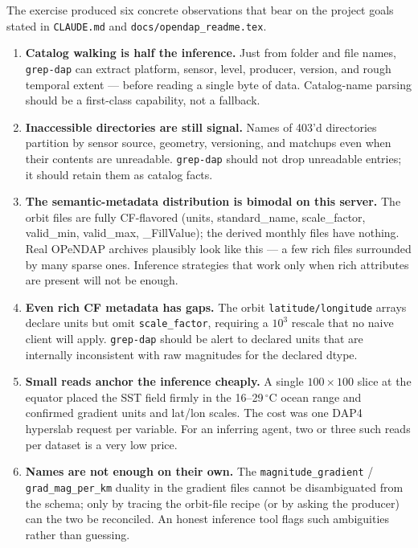 \documentclass[11pt]{article}
\begin{document}
The exercise produced six concrete observations that bear on the
project goals stated in \texttt{CLAUDE.md} and
\texttt{docs/opendap\_readme.tex}.

\begin{enumerate}
  \item \textbf{Catalog walking is half the inference.} Just from
    folder and file names, \texttt{grep-dap} can extract platform,
    sensor, level, producer, version, and rough temporal extent
    --- before reading a single byte of data. Catalog-name parsing
    should be a first-class capability, not a fallback.
  \item \textbf{Inaccessible directories are still signal.} Names
    of 403'd directories partition by sensor source, geometry,
    versioning, and matchups even when their contents are
    unreadable. \texttt{grep-dap} should not drop unreadable
    entries; it should retain them as catalog facts.
  \item \textbf{The semantic-metadata distribution is bimodal on
    this server.} The orbit files are fully CF-flavored (units,
    standard\_name, scale\_factor, valid\_min, valid\_max,
    \_FillValue); the derived monthly files have nothing. Real
    OPeNDAP archives plausibly look like this --- a few rich
    files surrounded by many sparse ones. Inference strategies
    that work only when rich attributes are present will not be
    enough.
  \item \textbf{Even rich CF metadata has gaps.} The orbit
    \texttt{latitude/longitude} arrays declare units but omit
    \texttt{scale\_factor}, requiring a $10^3$ rescale that no
    naive client will apply. \texttt{grep-dap} should be alert to
    declared units that are internally inconsistent with raw
    magnitudes for the declared dtype.
  \item \textbf{Small reads anchor the inference cheaply.} A
    single $100\times 100$ slice at the equator placed the SST
    field firmly in the 16--29$\,^\circ$C ocean range and
    confirmed gradient units and lat/lon scales. The cost was
    one DAP4 hyperslab request per variable. For an inferring
    agent, two or three such reads per dataset is a very low
    price.
  \item \textbf{Names are not enough on their own.} The
    \texttt{magnitude\_gradient} / \texttt{grad\_mag\_per\_km}
    duality in the gradient files cannot be disambiguated from
    the schema; only by tracing the orbit-file recipe (or by
    asking the producer) can the two be reconciled. An honest
    inference tool flags such ambiguities rather than guessing.
\end{enumerate}
\end{document}
